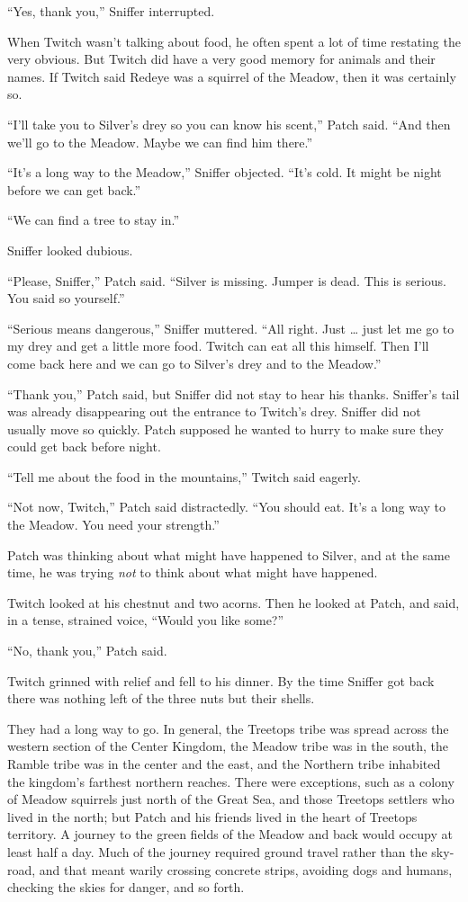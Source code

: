 \documentclass[ebook,oneside,openany,12pt]{memoir}
\begin{document}
“Yes, thank you,” Sniffer interrupted.

When Twitch wasn’t talking about food, he often spent a lot of time
restating the very obvious. But Twitch did have a very good memory for
animals and their names. If Twitch said Redeye was a squirrel of the
Meadow, then it was certainly so.

“I’ll take you to Silver’s drey so you can know his scent,” Patch
said. “And then we’ll go to the Meadow. Maybe we can find him there.”

“It’s a long way to the Meadow,” Sniffer objected. “It’s cold. It
might be night before we can get back.”

“We can find a tree to stay in.”

Sniffer looked dubious.

“Please, Sniffer,” Patch said. “Silver is missing. Jumper is
dead. This is serious. You said so yourself.”

“Serious means dangerous,” Sniffer muttered. “All right. Just … just
let me go to my drey and get a little more food. Twitch can eat all
this himself. Then I’ll come back here and we can go to Silver’s drey
and to the Meadow.”

“Thank you,” Patch said, but Sniffer did not stay to hear his
thanks. Sniffer’s tail was already disappearing out the entrance to
Twitch’s drey. Sniffer did not usually move so quickly. Patch supposed
he wanted to hurry to make sure they could get back before night.

“Tell me about the food in the mountains,” Twitch said eagerly.

“Not now, Twitch,” Patch said distractedly. “You should eat. It’s a
long way to the Meadow. You need your strength.”

Patch was thinking about what might have happened to Silver, and at
the same time, he was trying \emph{not} to think about what might
have happened.

Twitch looked at his chestnut and two acorns. Then he looked at Patch,
and said, in a tense, strained voice, “Would you like some?”

“No, thank you,” Patch said.

Twitch grinned with relief and fell to his dinner. By the time Sniffer
got back there was nothing left of the three nuts but their shells.

They had a long way to go. In general, the Treetops tribe was spread
across the western section of the Center Kingdom, the Meadow tribe was
in the south, the Ramble tribe was in the center and the east, and the
Northern tribe inhabited the kingdom’s farthest northern
reaches. There were exceptions, such as a colony of Meadow squirrels
just north of the Great Sea, and those Treetops settlers who lived in
the north; but Patch and his friends lived in the heart of Treetops
territory. A journey to the green fields of the Meadow and back would
occupy at least half a day. Much of the journey required ground travel
rather than the sky-road, and that meant warily crossing concrete
strips, avoiding dogs and humans, checking the skies for danger, and
so forth.
\end{document}
